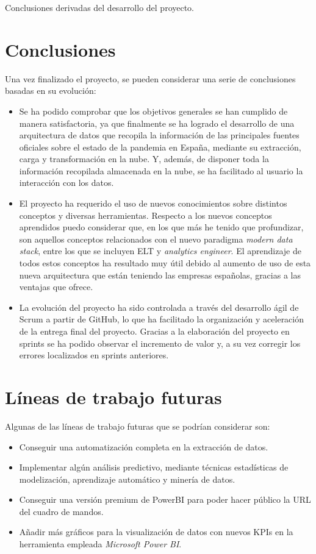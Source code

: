 
Conclusiones derivadas del desarrollo del proyecto.  

\section{Conclusiones}
Una vez finalizado el proyecto, se pueden considerar una serie de conclusiones basadas en su evolución:
\begin{itemize}
	\item Se ha podido comprobar que los objetivos generales se han cumplido de manera satisfactoria, ya que finalmente se ha logrado el desarrollo de una arquitectura de datos que recopila la información de las principales fuentes oficiales sobre el estado de la pandemia en España, mediante su extracción, carga y transformación en la nube. Y, además, de disponer toda la información recopilada almacenada en la nube, se ha facilitado al usuario la interacción con los datos.
	
	\item El proyecto ha requerido el uso de nuevos conocimientos sobre distintos conceptos y diversas herramientas.
	Respecto a los nuevos conceptos aprendidos puedo considerar que, en los que más he tenido que profundizar, son aquellos conceptos relacionados con el nuevo paradigma \emph{modern data stack}, entre los que se incluyen ELT y \emph{analytics engineer}. El aprendizaje de todos estos conceptos ha resultado muy útil debido al aumento de uso de esta nueva arquitectura que están teniendo las empresas españolas, gracias a las ventajas que ofrece.

	\item La evolución del proyecto ha sido controlada a través del desarrollo ágil de Scrum a partir de GitHub, lo que ha facilitado la organización y aceleración de la entrega final del proyecto. Gracias a la elaboración del proyecto en sprints se ha podido observar el incremento de valor y, a su vez corregir los errores localizados en sprints anteriores.
\end{itemize}

 \section{Líneas de trabajo futuras}
 Algunas de las líneas de trabajo futuras que se podrían considerar son:
\begin{itemize}
    \item Conseguir una automatización completa en la extracción de datos.
    \item Implementar algún análisis predictivo, mediante técnicas estadísticas de modelización, aprendizaje automático y minería de datos.
    \item Conseguir una versión premium de PowerBI para poder hacer público la URL del cuadro de mandos.
    \item Añadir más gráficos para la visualización de datos con nuevos KPIs en la herramienta empleada {\emph{Microsoft Power BI}}.
\end{itemize}
 


